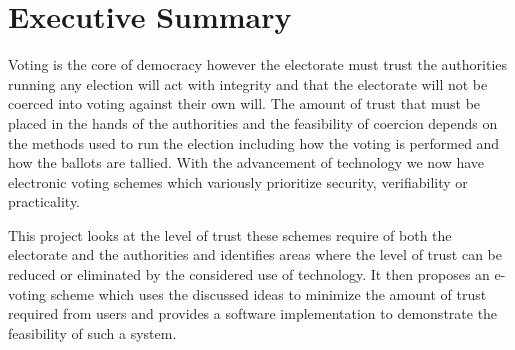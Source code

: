 \newpage
{}
\thispagestyle{plain}

\vspace*{\fill}

\section*{Executive Summary}


Voting is the core of democracy however the electorate must trust the authorities running any election will act with integrity and that the electorate will not be coerced into voting against their own will.
The amount of trust that must be placed in the hands of the authorities and the feasibility of coercion depends on the methods used to run the election including how the voting is performed and how the ballots are tallied.
With the advancement of technology we now have electronic voting schemes which variously prioritize security, verifiability or practicality.

This project looks at the level of trust these schemes require of both the electorate and the authorities and identifies areas where the level of trust can be reduced or eliminated by the considered use of technology.
It then proposes an e-voting scheme which uses the discussed ideas to minimize the amount of trust required from users and provides a software implementation to demonstrate the feasibility of such a system.

\vspace*{\fill}
